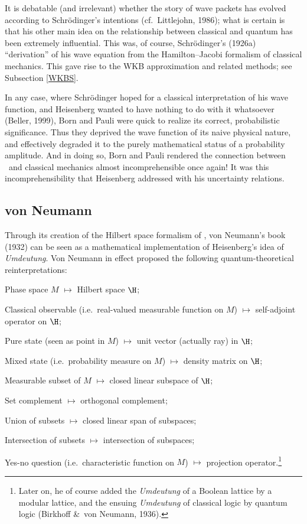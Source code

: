 \documentclass[12pt]{article}
\begin{document}
It is debatable (and irrelevant) whether the story of wave packets has evolved 
 according to Schr\"{o}dinger's intentions (cf.\ Littlejohn, 1986); what is certain is that his other main idea on the relationship between classical and quantum has been extremely influential. This was, of course,  Schr\"{o}dinger's (1926a) ``derivation'' of his wave equation from the Hamilton--Jacobi formalism of classical mechanics. This  gave rise to the WKB approximation and related methods; see Subsection \ref{WKBS}. 

In any case, where Schr\"{o}dinger hoped for a classical interpretation of his wave function, and Heisenberg wanted to have nothing to do with it whatsoever (Beller, 1999), 
Born and Pauli were quick to realize its correct, probabilistic significance.
Thus they deprived the wave function of its naive physical nature, and effectively 
 degraded it to the purely mathematical status of a probability amplitude.
And in doing so, Born and Pauli rendered the connection between \qm\ and classical mechanics almost incomprehensible once again! It was this incomprehensibility that Heisenberg addressed with his uncertainty relations.  
 \subsection{von Neumann}\label{vNs}
Through its creation of the Hilbert space formalism of \qm,  von Neumann's book  (1932) can be seen as a mathematical implementation of Heisenberg's idea of {\it Umdeutung}. Von Neumann in effect proposed the following quantum-theoretical reinterpretations:
\begin{trivlist}
\item Phase space $M$ $\mathbf{\mapsto}$ Hilbert space $\H$;
\item  Classical observable (i.e.\ real-valued measurable function on $M$)  $\mathbf{\mapsto}$ self-adjoint operator on $\H$;
\item Pure state (seen as point in $M$)  $\mathbf{\mapsto}$ unit vector (actually ray)  in $\H$;
\item Mixed state (i.e.\ probability measure on $M$) $\mathbf{\mapsto}$  density matrix on $\H$;
\item Measurable subset of $M$  $\mathbf{\mapsto}$ closed linear subspace  of $\H$;
\item Set complement  $\mathbf{\mapsto}$ orthogonal complement;
\item Union of subsets  $\mathbf{\mapsto}$ closed linear span of subspaces;
\item Intersection of subsets $\mathbf{\mapsto}$ intersection of subspaces;
\item Yes-no question (i.e.\ characteristic function on $M$) $\mathbf{\mapsto}$ projection operator.\footnote{Later on, he of course added the {\it Umdeutung} of a Boolean lattice by a modular lattice, and  the ensuing {\it Umdeutung} of classical logic by quantum logic (Birkhoff \&\ von Neumann,  1936). }
 \end{trivlist}
\end{document}
